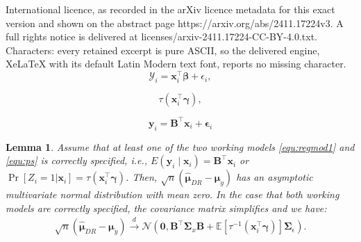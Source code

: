 \documentclass[10pt,a4paper]{amsart}
\newtheorem{lemma}{Lemma}
\newcommand{\LogCoe}{\boldsymbol{\gamma}}
\newcommand{\ObsCov}{\textbf{x}_i}
\newcommand{\ObsRes}{\textbf{y}_i}
\begin{document}
International licence, as recorded in the arXiv licence metadata for this exact version and shown on the abstract page https://arxiv.org/abs/2411.17224v3. A full rights notice is delivered at licenses/arxiv-2411.17224-CC-BY-4.0.txt. Characters: every retained excerpt is pure ASCII, so the delivered engine, XeLaTeX with its default Latin Modern text font, reports no missing character.
        \begin{equation}\label{equ:regmod1}
            \mathcal{Y}_i = \ObsCov^{\top}\boldsymbol{\beta} + \epsilon_i,
        \end{equation}

            \begin{equation}\label{equ:ps}
               \tau(\ObsCov^{\top} \LogCoe),
            \end{equation}

        \begin{equation}\label{equ:regmod2}
            \ObsRes = \textbf{B}^{\top} \ObsCov + \boldsymbol{\epsilon}_i
        \end{equation}

    \begin{lemma}\label{lemma:finite_DR}
       Assume that at least one of the two working models \eqref{equ:regmod1} and \eqref{equ:ps} is correctly specified, i.e., $E(\ObsRes \mid \ObsCov)= \textbf{B}^{\top} \ObsCov$ or $\Pr[ Z_i=1 | \ObsCov ]= \tau(\ObsCov^{\top} \LogCoe)$. Then,  $\sqrt{n}(\hat{\boldsymbol{\mu}}_{DR} - \boldsymbol{\mu}_y)$ has an asymptotic multivariate normal distribution with mean zero. In the case that both working models are correctly specified, the covariance matrix simplifies and we have:
       \begin{align*}
           \sqrt{n}(\hat{\boldsymbol{\mu}}_{DR} - \boldsymbol{\mu}_y) \overset{d}{\rightarrow} \mathcal{N}\left(\textbf{0}, \textbf{B}^{\top} \boldsymbol{\Sigma}_{x} \textbf{B} + \mathbb{E} [\tau^{-1}(\ObsCov^{\top}\LogCoe)] \boldsymbol{\Sigma}_{\epsilon}\right).
       \end{align*} 
    \end{lemma}
\end{document}
